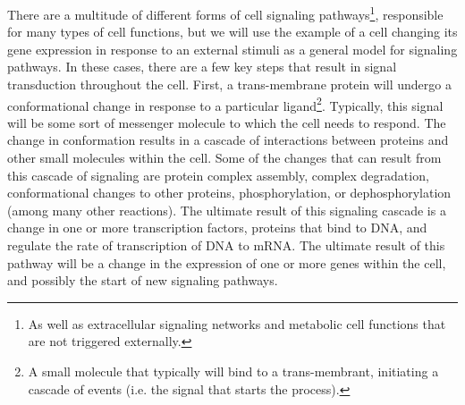 \documentclass[12pt,twoside]{reedthesis}
\theoremstyle{definition}
\begin{document}
There are a multitude of different forms of cell signaling pathways\footnote{As well as extracellular signaling networks and metabolic cell functions that are not triggered externally.}, responsible for many types of cell functions, but we will use the example of a cell changing its gene expression in response to an external stimuli as a general model for signaling pathways. In these cases, there are a few key steps that result in signal transduction throughout the cell. First, a trans-membrane protein will undergo a conformational change in response to a particular ligand\footnote{A small molecule that typically will bind to a trans-membrant, initiating a cascade of events (i.e. the signal that starts the process).}. Typically, this signal will be some sort of messenger molecule to which the cell needs to respond. The change in conformation results in a cascade of interactions between proteins and other small molecules within the cell. Some of the changes that can result from this cascade of signaling are protein complex assembly, complex degradation, conformational changes to other proteins, phosphorylation, or dephosphorylation (among many other reactions). The ultimate result of this signaling cascade is a change in one or more transcription factors, proteins that bind to DNA, and regulate the rate of transcription of DNA to mRNA. The ultimate result of this pathway will be a change in the expression of one or more genes within the cell, and possibly the start of new signaling pathways.\par
\end{document}
